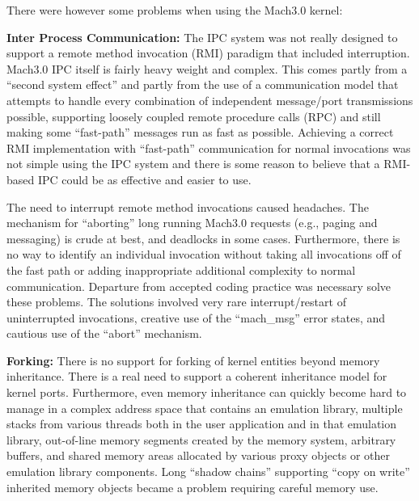 There were however some problems when using the Mach3.0 kernel:
\begin{description}
\item{\bf Inter Process Communication: } The IPC
system was not really designed to support a 
remote method invocation (RMI) paradigm
that included interruption.  Mach3.0 IPC itself is fairly heavy weight 
and complex.
This comes partly from a ``second system effect''
and partly from the use of a communication model that
attempts to handle every combination of independent
message/port transmissions possible, supporting loosely coupled 
remote procedure calls (RPC) and
still making some ``fast-path'' messages run as fast as possible.
Achieving a correct RMI implementation with
``fast-path'' communication for normal invocations was not simple
using the IPC system and there is some reason to believe that 
a RMI-based IPC could be as effective and easier to use.

The need to interrupt remote method invocations caused
headaches.  The mechanism for ``aborting'' long running Mach3.0 requests
(e.g., paging and messaging) is crude at best, and deadlocks in some cases.
Furthermore, there is no way to identify an individual invocation
without taking all invocations off of the fast path or adding inappropriate
additional complexity to normal communication.  
Departure from accepted coding practice was necessary
solve these problems.
The solutions
involved very rare interrupt/restart of uninterrupted invocations,
creative use of the ``mach\_msg'' error states, and cautious use of the
``abort'' mechanism.

\item{\bf Forking: }
There is no support for forking of kernel
entities beyond memory inheritance.  There is a real need to support
a coherent inheritance model for kernel ports.
Furthermore, even memory inheritance can quickly become hard to
manage in a complex address space that contains an emulation library,
multiple stacks from various threads both in the user application and
in that emulation library, out-of-line memory segments created by the
memory system, arbitrary buffers, and shared memory areas allocated
by various proxy objects or other emulation library components.   Long
``shadow chains'' supporting ``copy on write'' inherited memory objects
became a problem requiring careful memory use.
\end{description}

